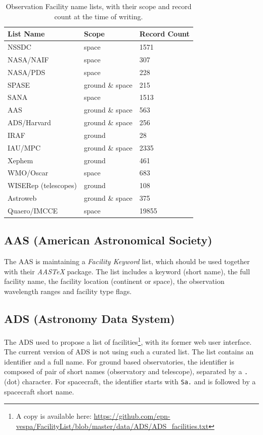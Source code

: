 \documentclass[11pt,a4paper]{ivoa}
\begin{document}
\begin{table}
\caption{Observation Facility name lists, with their scope and record 
count at the time of writing.}\label{tab:lists}
\begin{tabular}{lll}
List Name               & Scope           & Record Count \\
\hline
NSSDC                   &           space & 1571 \\
NASA/NAIF               &           space & 307 \\
NASA/PDS                &           space & 228 \\
SPASE                   & ground \& space & 215 \\
SANA                    &           space & 1513 \\
AAS                     & ground \& space & 563 \\
ADS/Harvard             & ground \& space & 256 \\
IRAF                    & ground          & 28 \\
IAU/MPC                 & ground \& space & 2335 \\
Xephem                  & ground          & 461 \\
WMO/Oscar               &           space & 683 \\
WISERep (telescopes)    & ground          & 108 \\
Astroweb                & ground \& space & 375 \\
Quaero/IMCCE            &           space & 19855
\end{tabular}
\end{table}


\subsection{AAS (American Astronomical Society)}
The AAS is maintaining a \emph{Facility Keyword} list, which should be used
together with their \emph{AASTeX} package. The list includes a keyword 
(short name), the full facility name, the facility location (continent or 
space), the observation wavelength ranges and facility type flags.  

\subsection{ADS (Astronomy Data System)}
The ADS used to propose a list of facilities\footnote{A copy is available here: 
\protect\url{https://github.com/epn-vespa/FacilityList/blob/master/data/ADS/ADS_facilities.txt}}, 
with its former web user interface. The current version of ADS is not using 
such a curated list. The list contains an identifier and a full name. For 
ground based observatories, the identifier is composed of pair of 
short names (observatory and telescope), separated by a \texttt{.} (dot) 
character. For spacecraft, the identifier starts with \texttt{Sa.} and is 
followed by a spacecraft short name.
\end{document}
